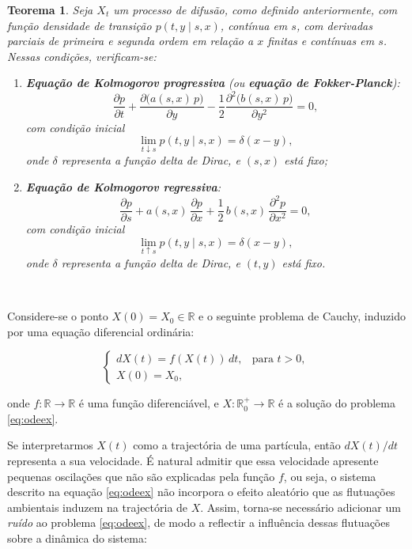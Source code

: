 \documentclass[
  11pt,
  a4paper,
]{book}
\newtheorem{theorem}{Teorema}[chapter]
\theoremstyle{definition}
\theoremstyle{definition}
\theoremstyle{definition}
\theoremstyle{definition}
\theoremstyle{remark}
\begin{document}
\begin{theorem}

Seja \(X_t\) um processo de difusão, como definido anteriormente, com função densidade de transição \(p(t, y \mid s, x)\), contínua em \(s\), com derivadas parciais de primeira e segunda ordem em relação a \(x\) finitas e contínuas em \(s\). Nessas condições, verificam-se:

\begin{enumerate}
\def\labelenumi{\arabic{enumi}.}
\item
  \textbf{Equação de Kolmogorov progressiva} (ou \textbf{equação de Fokker-Planck}):
  \[
  \frac{\partial p}{\partial t} + \frac{\partial\big(a(s,x)\,p\big)}{\partial y} - \frac{1}{2} \frac{\partial^2\big(b(s,x)\,p\big)}{\partial y^2} = 0,
  \]
  com condição inicial
  \[
  \lim_{t \downarrow s} p(t, y \mid s, x) = \delta(x - y),
  \]
  onde \(\delta\) representa a função delta de Dirac, e \((s, x)\) está fixo;
\item
  \textbf{Equação de Kolmogorov regressiva}:
  \[
  \frac{\partial p}{\partial s} + a(s,x)\,\frac{\partial p}{\partial x} + \frac{1}{2}\,b(s,x)\,\frac{\partial^2 p}{\partial x^2} = 0,
  \]
  com condição inicial
  \[
  \lim_{t \uparrow s} p(t, y \mid s, x) = \delta(x - y),
  \]
  onde \(\delta\) representa a função delta de Dirac, e \((t, y)\) está fixo.
\end{enumerate}

\end{theorem}

\(\,\)

Considere-se o ponto \(X(0) = X_0 \in \mathbb{R}\) e o seguinte problema de Cauchy, induzido por uma equação diferencial ordinária:

\[
\begin{cases}
dX(t) = f(X(t))\,dt, & \text{para } t > 0, \\
X(0) = X_0, &
\end{cases}
\label{eq:odeex}
\]

onde \(f: \mathbb{R} \rightarrow \mathbb{R}\) é uma função diferenciável, e \(X: \mathbb{R}_0^+ \rightarrow \mathbb{R}\) é a solução do problema \eqref{eq:odeex}.

Se interpretarmos \(X(t)\) como a trajectória de uma partícula, então \(dX(t)/dt\) representa a sua velocidade. É natural admitir que essa velocidade apresente pequenas oscilações que não são explicadas pela função \(f\), ou seja, o sistema descrito na equação \eqref{eq:odeex} não incorpora o efeito aleatório que as flutuações ambientais induzem na trajectória de \(X\). Assim, torna-se necessário adicionar um \emph{ruído} ao problema \eqref{eq:odeex}, de modo a reflectir a influência dessas flutuações sobre a dinâmica do sistema:
\end{document}
